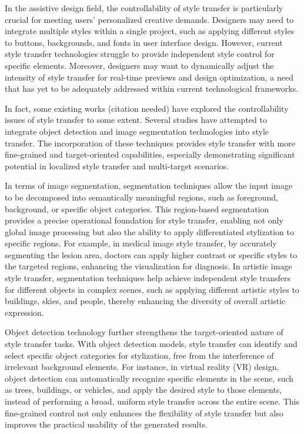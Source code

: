 \documentclass[preprint,12pt]{elsarticle}
\begin{document}
In the assistive design field\citep{10liu2021self,11bae2023unsupervised,12hollein2022stylemesh,13yin20213dstylenet,14yang2022industrial}, the controllability of style transfer is particularly crucial for meeting users' personalized creative demands. Designers may need to integrate multiple styles within a single project, such as applying different styles to buttons, backgrounds, and fonts in user interface design. However, current style transfer technologies struggle to provide independent style control for specific elements. Moreover, designers may want to dynamically adjust the intensity of style transfer for real-time previews and design optimization, a need that has yet to be adequately addressed within current technological frameworks.

In fact, some existing works (citation needed) have explored the controllability issues of style transfer to some extent. Several studies\citep{107yu2024foreground,109ding2024regional} have attempted to integrate object detection and image segmentation technologies into style transfer. The incorporation of these techniques provides style transfer with more fine-grained and target-oriented capabilities, especially demonstrating significant potential in localized style transfer and multi-target scenarios.

In terms of image segmentation\citep{127wang2022learning,128minaee2021image}, segmentation techniques allow the input image to be decomposed into semantically meaningful regions, such as foreground, background, or specific object categories. This region-based segmentation provides a precise operational foundation for style transfer, enabling not only global image processing but also the ability to apply differentiated stylization to specific regions. For example, in medical image style transfer, by accurately segmenting the lesion area, doctors can apply higher contrast or specific styles to the targeted regions, enhancing the visualization for diagnosis. In artistic image style transfer, segmentation techniques help achieve independent style transfers for different objects in complex scenes, such as applying different artistic styles to buildings, skies, and people, thereby enhancing the diversity of overall artistic expression.

Object detection technology\citep{120wang2022visual, 129kaur2023comprehensive} further strengthens the target-oriented nature of style transfer tasks. With object detection models, style transfer can identify and select specific object categories for stylization, free from the interference of irrelevant background elements. For instance, in virtual reality (VR) design, object detection can automatically recognize specific elements in the scene, such as trees, buildings, or vehicles, and apply the desired style to those elements, instead of performing a broad, uniform style transfer across the entire scene. This fine-grained control not only enhances the flexibility of style transfer but also improves the practical usability of the generated results.
\end{document}
